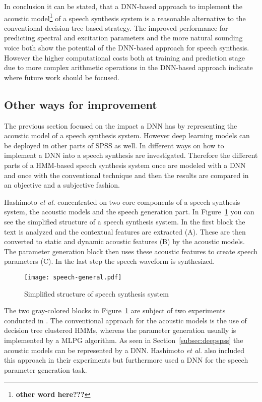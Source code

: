 In conclusion it can be stated, that a \ac{DNN}-based approach to implement the acoustic model\footnote{\textbf{\color{ACMRed} other word here???}} of a speech synthesis system is a reasonable alternative to the conventional decision tree-based strategy. The improved performance for predicting spectral and excitation parameters and the more natural sounding voice both show the potential of the \ac{DNN}-based approach for speech synthesis. However the higher computational costs both at training and prediction stage due to more complex arithmetic operations in the \ac{DNN}-based approach indicate where future work should be focused.

\subsection{Other ways for improvement}
\label{subsec:deepeffect}

The previous section focused on the impact a \ac{DNN} has by representing the acoustic model of a speech synthesis system. However deep learning models can be deployed in other parts of \ac{SPSS} as well. In \cite{hashimoto:effect} different ways on how to implement a \ac{DNN} into a speech synthesis are investigated. Therefore the different parts of a \ac{HMM}-based speech synthesis system once are modeled with a \ac{DNN} and once with the conventional technique and then the results are compared in an objective and a subjective fashion.

Hashimoto \textit{et al.} concentrated on two core components of a speech synthesis system, the acoustic models and the speech generation part. In Figure~\ref{fig:generalspeech} you can see the simplified structure of a speech synthesis system. In the first block the text is analyzed and the contextual features are extracted (A). These are then converted to static and dynamic acoustic features (B) by the acoustic models. The parameter generation block then uses these acoustic features to create speech parameters (C). In the last step the speech waveform is synthesized.

\begin{figure}[h]
	\texttt{[image: speech-general.pdf]}
	\caption{Simplified structure of speech synthesis system \cite{hashimoto:effect}}
	\label{fig:generalspeech}
\end{figure}

The two gray-colored blocks in Figure~\ref{fig:generalspeech} are subject of two experiments conducted in \cite{hashimoto:effect}. The conventional approach for the acoustic models is the use of decision tree clustered \acp{HMM}, whereas the parameter generation usually is implemented by a \ac{MLPG} algorithm. As seen in Section~\ref{subsec:deepspss} the acoustic models can be represented by a \ac{DNN}. Hashimoto \textit{et al.} also included this approach in their experiments but furthermore used a \ac{DNN} for the speech parameter generation task.

